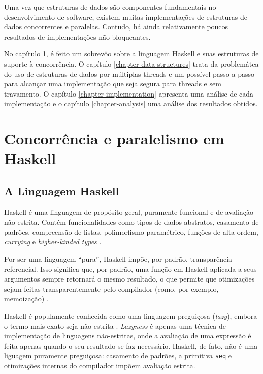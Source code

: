\documentclass[a4paper,12pt,oldfontcommands]{abntex2}
\begin{document}
Uma vez que estruturas de dados são componentes fundamentais no desenvolvimento de software, existem muitas implementações de estruturas de dados concorrentes e paralelas. Contudo, há ainda relativamente poucos resultados de implementações não-bloqueantes.

No capítulo \ref{chapter-haskell-primer}, é feito um sobrevôo sobre a linguagem Haskell e suas estruturas de suporte à concorrência. O capítulo \ref{chapter-data-structures} trata da problemátca do uso de estruturas de dados por múltiplas threads e um possível passo-a-passo para alcançar uma implementação que seja segura para threads e sem travamento. O capítulo \ref{chapter-implementation} apresenta uma análise de cada implementação e o capítulo \ref{chapter-analysis} uma análise dos resultados obtidos.

\chapter{Concorrência e paralelismo em Haskell}\label{chapter-haskell-primer}

\section{A Linguagem Haskell}

Haskell é uma linguagem de propósito geral, puramente funcional e de avaliação não-estrita. Contém funcionalidades como tipos de dados abstratos, casamento de padrões, compreensão de listas, polimorfismo paramétrico, funções de alta ordem, \textit{currying} e \textit{higher-kinded types} \cite{jones2003haskell}.

Por ser uma linguagem ``pura'', Haskell impõe, por padrão, transparência referencial. Isso significa que, por padrão, uma função em Haskell aplicada a seus argumentos sempre retornará o mesmo resultado, o que permite que otimizações sejam feitas transparentemente pelo compilador (como, por exemplo, memoização) \cite{brown2007monadic}.

Haskell é populamente conhecida como uma linguagem preguiçosa (\textit{lazy}), embora o termo mais exato seja não-estrita \cite{hudak2007history}. \textit{Lazyness} é apenas uma técnica de implementação de linguagens não-estritas, onde a avaliação de uma expressão é feita apenas quando o seu resultado se faz necessário. Haskell, de fato, não é uma liguagem puramente preguiçosa: casamento de padrões, a primitiva \texttt{seq} e otimizações internas do compilador impõem avaliação estrita.
\end{document}
